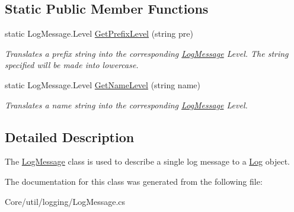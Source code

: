 \subsection*{Static Public Member Functions}
\begin{DoxyCompactItemize}
\item 
\hypertarget{class_m_b_c_1_1_core_1_1util_1_1_log_message_a118fce73f3b41f40305c7e7efc687620}{static Log\-Message.\-Level \hyperlink{class_m_b_c_1_1_core_1_1util_1_1_log_message_a118fce73f3b41f40305c7e7efc687620}{Get\-Prefix\-Level} (string pre)}\label{class_m_b_c_1_1_core_1_1util_1_1_log_message_a118fce73f3b41f40305c7e7efc687620}

\begin{DoxyCompactList}\small\item\em Translates a prefix string into the corresponding \hyperlink{class_m_b_c_1_1_core_1_1util_1_1_log_message}{Log\-Message} Level. The string specified will be made into lowercase.\end{DoxyCompactList}\item 
\hypertarget{class_m_b_c_1_1_core_1_1util_1_1_log_message_a5826ddb8de3dbc2c294d5ea98756c911}{static Log\-Message.\-Level \hyperlink{class_m_b_c_1_1_core_1_1util_1_1_log_message_a5826ddb8de3dbc2c294d5ea98756c911}{Get\-Name\-Level} (string name)}\label{class_m_b_c_1_1_core_1_1util_1_1_log_message_a5826ddb8de3dbc2c294d5ea98756c911}

\begin{DoxyCompactList}\small\item\em Translates a name string into the corresponding \hyperlink{class_m_b_c_1_1_core_1_1util_1_1_log_message}{Log\-Message} Level.\end{DoxyCompactList}\end{DoxyCompactItemize}


\subsection{Detailed Description}
The \hyperlink{class_m_b_c_1_1_core_1_1util_1_1_log_message}{Log\-Message} class is used to describe a single log message to a \hyperlink{class_m_b_c_1_1_core_1_1util_1_1_log}{Log} object.

The documentation for this class was generated from the following file\-:\begin{DoxyCompactItemize}
\item 
Core/util/logging/Log\-Message.\-cs\end{DoxyCompactItemize}
